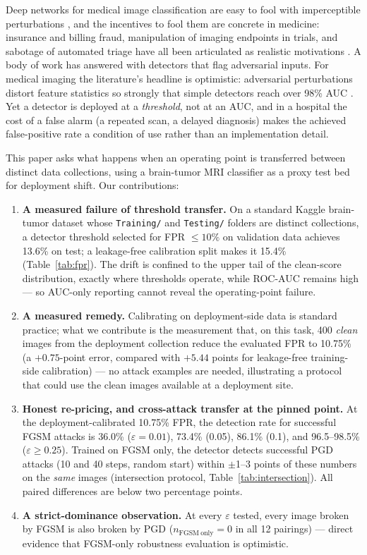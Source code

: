\documentclass[runningheads]{llncs}
\begin{document}
Deep networks for medical image classification are easy to fool with
imperceptible perturbations \cite{goodfellow2015fgsm}, and the
incentives to fool them are concrete in medicine: insurance and billing
fraud, manipulation of imaging endpoints in trials, and sabotage of
automated triage have all been articulated as realistic motivations
\cite{finlayson2019}. A body of work has answered with detectors that
flag adversarial inputs. For
medical imaging the literature's headline is optimistic: adversarial
perturbations distort feature statistics so strongly that simple
detectors reach over 98\% AUC \cite{ma2021understanding}. Yet a detector
is deployed at a \emph{threshold}, not at an AUC, and in a hospital the
cost of a false alarm (a repeated scan, a delayed diagnosis) makes the
achieved false-positive rate a condition of use rather than an
implementation detail.

This paper asks what happens when an operating point is transferred
between distinct data collections, using a brain-tumor MRI classifier as
a proxy test bed for deployment shift. Our contributions:
\begin{enumerate}
\item \textbf{A measured failure of threshold transfer.} On a standard
  Kaggle brain-tumor dataset whose \texttt{Training/} and
  \texttt{Testing/} folders are distinct collections, a detector
  threshold selected for FPR $\le 10\%$ on validation data achieves
  13.6\% on test; a leakage-free calibration split makes it 15.4\%
  (Table~\ref{tab:fpr}). The drift is confined to the upper tail of the
  clean-score distribution, exactly where thresholds operate, while
  ROC-AUC remains high --- so AUC-only reporting cannot reveal the
  operating-point failure.
\item \textbf{A measured remedy.} Calibrating on deployment-side data
  is standard practice; what we contribute is the measurement that, on
  this task, 400 \emph{clean} images from the deployment collection
  reduce the evaluated FPR to 10.75\% (a $+0.75$-point error, compared
  with $+5.44$ points for leakage-free training-side calibration) --- no
  attack examples are needed, illustrating a protocol that could use
  the clean images available at a deployment site.
\item \textbf{Honest re-pricing, and cross-attack transfer at the pinned
  point.} At the deployment-calibrated 10.75\% FPR, the detection rate
  for successful FGSM attacks is 36.0\% ($\varepsilon=0.01$), 73.4\%
  (0.05), 86.1\% (0.1), and 96.5--98.5\%
  ($\varepsilon \ge 0.25$). Trained on FGSM only, the
  detector detects successful PGD attacks (10 and 40 steps, random
  start) within $\pm$1--3 points of these numbers on the \emph{same}
  images (intersection protocol, Table~\ref{tab:intersection}). All
  paired differences are below two percentage points.
\item \textbf{A strict-dominance observation.} At every $\varepsilon$
  tested, every image broken by FGSM is also broken by PGD
  ($n_{\mathrm{FGSM~only}}=0$ in all 12 pairings) --- direct evidence
  that FGSM-only robustness evaluation is optimistic.
\end{enumerate}
\end{document}
